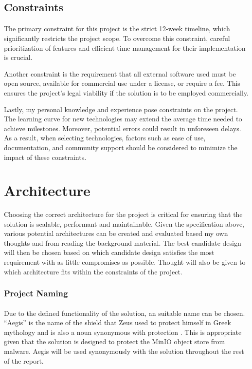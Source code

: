 \documentclass[12pt, conference, final, a4paper, onecolumn, compsoc]{IEEEtran}
\begin{document}
\subsection{Constraints}
\paragraph{}

The primary constraint for this project is the strict 12-week timeline, which
significantly restricts the project scope. To overcome this constraint, careful
prioritization of features and efficient time management for their
implementation is crucial.

Another constraint is the requirement that all external software used must be
open source, available for commercial use under a license, or require a fee.
This ensures the project's legal viability if the solution is to be employed
commercially.

Lastly, my personal knowledge and experience pose constraints on the project.
The learning curve for new technologies may extend the average time needed to
achieve milestones. Moreover, potential errors could result in unforeseen
delays. As a result, when selecting technologies, factors such as ease of use,
documentation, and community support should be considered to minimize the impact
of these constraints.

\section{Architecture}

\paragraph{}
Choosing the correct architecture for the project is critical for ensuring that
the solution is scalable, performant and maintainable. Given the specification
above, various potential architectures can be created and evaluated based my own
thoughts and from reading the background material. The best candidate design
will then be chosen based on which candidate design satisfies the most
requirement with as little compromises as possible. Thought will also be given
to which architecture fits within the constraints of the project.

\subsubsection*{Project Naming}
\paragraph{}
Due to the defined functionality of the solution, an suitable name can be
chosen. ``Aegis'' is the name of the shield that Zeus used to protect himself in
Greek mythology and is also a noun synonymous with protection \citep{aegis}. This is
appropriate given that the solution is designed to protect the MinIO object
store from malware. Aegis will be used synonymously with the solution throughout
the rest of the report.
\end{document}
